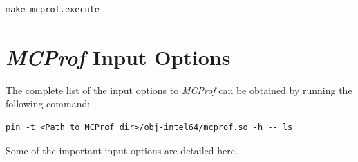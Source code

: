 \documentclass[10pt]{article}
\newcommand{\MCPROF}{\emph{MCProf}}
\begin{document}
{
\small
\begin{Verbatim}[frame=single]
make mcprof.execute
\end{Verbatim}
}


\section{\MCPROF{} Input Options}
\label{sec:inputopt}

The complete list of the input options to \MCPROF{} can be obtained by running
the following command:

{
\small
\begin{Verbatim}[frame=single]
pin -t <Path to MCProf dir>/obj-intel64/mcprof.so -h -- ls
\end{Verbatim}
}

Some of the important input options are detailed here.
\end{document}
